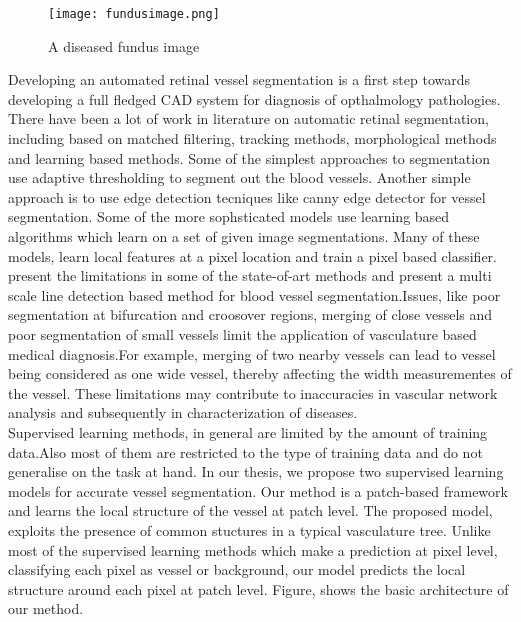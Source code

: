 \begin{figure}
		\centering	
		\texttt{[image: fundusimage.png]}
		\caption{A diseased fundus image}
		\label{fig:fundusdiseased}		
\end{figure}	

Developing an automated retinal vessel segmentation is a first step towards developing a full fledged CAD system for diagnosis of opthalmology pathologies. There have been a lot of work in literature on automatic retinal segmentation, including based on matched filtering, tracking methods, morphological methods and learning based methods. Some of the simplest approaches to segmentation use adaptive thresholding to segment out the blood vessels. Another simple approach is to use edge detection tecniques like canny edge detector for vessel segmentation. Some of the more sophsticated models use learning based algorithms which learn on a set of given image segmentations. Many of these models, learn local features at a pixel location and train a pixel based classifier.\citep{nguyen2011effective} present the limitations in some of the state-of-art methods and present a multi scale line detection based method for blood vessel segmentation.Issues, like poor segmentation at bifurcation and croosover regions, merging of close vessels and poor segmentation of small vessels limit the application of vasculature based medical diagnosis.For example, merging of two nearby vessels can lead to vessel being considered as one wide vessel, thereby affecting the width measurementes of the vessel. These limitations may contribute to inaccuracies in vascular network analysis and subsequently in characterization of diseases. \\

Supervised learning methods, in general are limited by the amount of training data.Also most of them are restricted to the type of training data and do not generalise on the task at hand. In our thesis, we propose two supervised learning models for accurate vessel segmentation. Our method is a patch-based framework and learns the local structure of the vessel at patch level. The proposed model, exploits the presence of common stuctures in a typical vasculature tree. Unlike most of the supervised learning methods which make a prediction at pixel level, classifying each pixel as vessel or background, our model predicts the local structure around each pixel at patch level. Figure, shows the basic architecture of our method.


